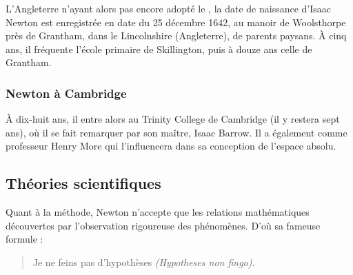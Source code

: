 \documentclass{article}
\begin{document}
L'Angleterre n'ayant alors pas encore adopté le 
,
la date de naissance d’Isaac Newton est enregistrée en date du 25 décembre 1642,
au manoir de Woolsthorpe près de Grantham, dans le Lincolnshire (Angleterre),
de parents paysans. 
À cinq ans, il fréquente l’école primaire de Skillington, puis à
douze ans celle de Grantham.

\subsubsection*{Newton à Cambridge}

À dix-huit ans, il entre alors au Trinity College de Cambridge (il y restera
sept ans), où il se fait remarquer par son maître, Isaac Barrow. Il a également
comme professeur Henry More qui l'influencera dans sa conception de l'espace
absolu.

\subsection*{Théories scientifiques}

Quant à la méthode, Newton n'accepte que les relations mathématiques découvertes
par l'observation rigoureuse des phénomènes. D'où sa fameuse formule :

	\begin{quotation}
 Je ne feins pas d'hypothèses \textit{(Hypotheses non fingo)}.
	\end{quotation}

\end{document}
